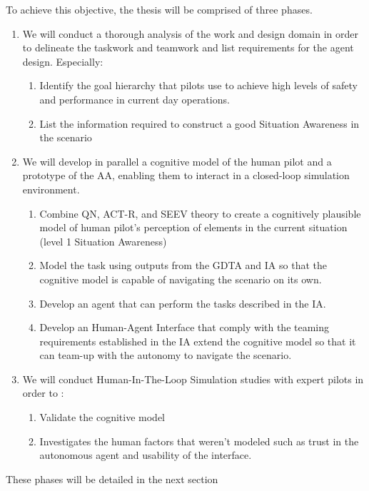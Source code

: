 \documentclass[12pt,a4paper]{article} %
\begin{document}
	To achieve this objective, the thesis will be comprised of three phases.
	\begin{enumerate}[label=\textbf{\arabic*.}]
		\item We will conduct a thorough analysis of the work and design domain in order to delineate the taskwork and teamwork and list requirements for the agent design. Especially:
		\begin{enumerate}[label=\textbf{\arabic{enumi}.\Alph*.}]
			\item \label{obj:1a} Identify the goal hierarchy that pilots use to achieve high levels of safety and performance in current day operations.
			\item \label{obj:1b} List the information required to construct a good Situation Awareness in the scenario 
		\end{enumerate}
		\item We will develop in parallel a cognitive model of the human pilot and a prototype of the AA, enabling them to interact in a closed-loop simulation environment. 
		\begin{enumerate}[label=\textbf{\arabic{enumi}.\Alph*.}]
			\item \label{obj:2a} Combine QN, ACT-R, and SEEV theory to create a cognitively plausible model of human pilot's perception of elements in the current situation (level 1 Situation Awareness)
			\item \label{obj:2b} Model the task using outputs from the GDTA and IA so that the cognitive model is capable of navigating the scenario on its own.
			\item \label{obj:2c} Develop an agent that can perform the tasks described in the IA.
			\item \label{obj:2d} Develop an Human-Agent Interface that comply with the teaming requirements established in the IA extend the cognitive model so that it can team-up with the autonomy to navigate the scenario.
		\end{enumerate}  
		\item We will conduct Human-In-The-Loop Simulation studies with expert pilots in order to :
		\begin{enumerate}[label=\textbf{\arabic{enumi}.\Alph*.}]
			\item \label{obj:3a} Validate the cognitive model
			\item \label{obj:3b} Investigates the human factors that weren't modeled such as trust in the autonomous agent and usability of the interface.
		\end{enumerate}
	\end{enumerate}
	These phases will be detailed in the next section 
	
\end{document}
